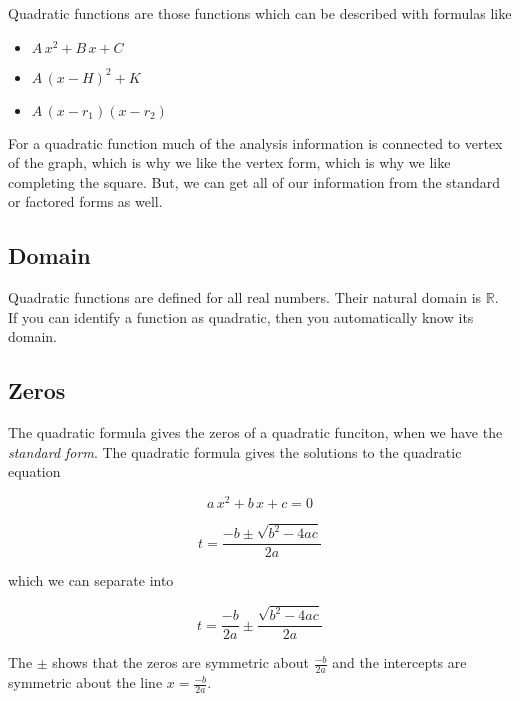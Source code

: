 \documentclass{ximera}
\begin{document}
Quadratic functions are those functions which can be described with formulas like

\begin{itemize}
     \item $A \, x^2 + B \, x + C$
     \item $A \, (x - H)^2 + K$
     \item $A \, (x - r_1) (x-r_2)$
\end{itemize}

For a quadratic function much of the analysis information is connected to vertex of the graph, which is why we like the vertex form, which is why we like completing the square.  But, we can get all of our information from the standard or factored forms as well.





\subsection*{Domain} 

Quadratic functions are defined for all real numbers.  Their natural domain is $\mathbb{R}$. \\

If you can identify a function as quadratic, then you automatically know its domain. \\











\subsection*{Zeros}


The quadratic formula gives the zeros of a quadratic funciton, when we have the \textit{standard form}. The quadratic formula gives the solutions to the quadratic equation

\[
a \, x^2 + b \, x + c = 0
\]

\[ t  =   \frac{-b \pm \sqrt{b^2 - 4 a c}}{2a}      \]



which we can separate into 



\[ t  =   \frac{-b}{2a} \pm \frac{\sqrt{b^2 - 4 a c}}{2a}      \]


The $\pm$ shows that the zeros are symmetric about $\frac{-b}{2a}$ and the intercepts are symmetric about the line $x = \frac{-b}{2a}$. \\
\end{document}
